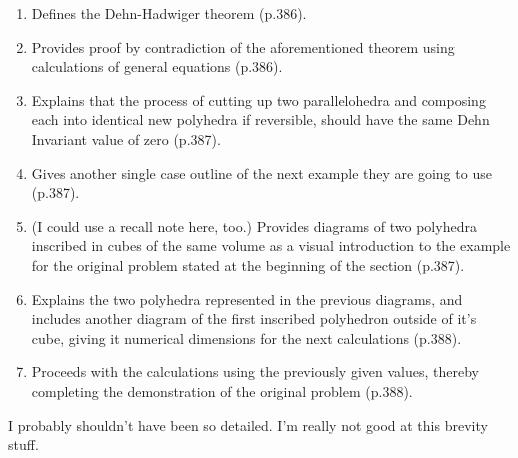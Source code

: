 \documentclass{article}
\begin{document}
\begin{enumerate}
    \item Defines the Dehn-Hadwiger theorem (p.386).
    
    \item Provides proof by contradiction of the aforementioned theorem using calculations of general equations (p.386).
    
    \item Explains that the process of cutting up two parallelohedra and composing each into identical new polyhedra if reversible, should have the same Dehn Invariant value of zero (p.387).
    
    \item Gives another single case outline of the next example they are going to use (p.387).
    
    \item (I could use a recall note here, too.) Provides diagrams of two polyhedra inscribed in cubes of the same volume as a visual introduction to the example for the original problem stated at the beginning of the section (p.387).
    
    \item Explains the two polyhedra represented in the previous diagrams, and includes another diagram of the first inscribed polyhedron outside of it's cube, giving it numerical dimensions for the next calculations (p.388).
    
    \item Proceeds with the calculations using the previously given values, thereby completing the demonstration of the original problem (p.388).
    
\end{enumerate}

I probably shouldn't have been so detailed. I'm really not good at this brevity stuff.
\end{document}
